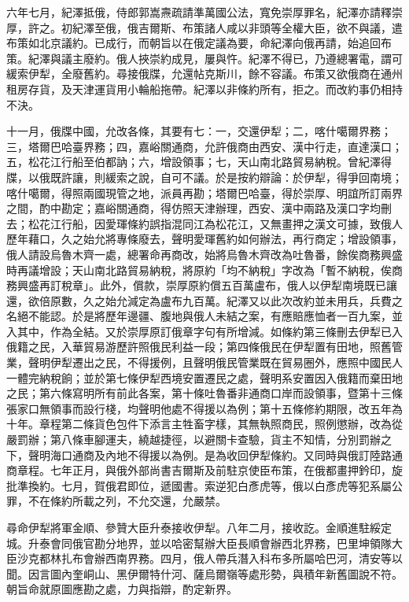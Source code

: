 \begin{pinyinscope}
六年七月，紀澤抵俄，侍郎郭嵩燾疏請準萬國公法，寬免崇厚罪名，紀澤亦請釋崇厚，許之。初紀澤至俄，俄吉爾斯、布策諸人咸以非頭等全權大臣，欲不與議，遣布策如北京議約。已成行，而朝旨以在俄定議為要，命紀澤向俄再請，始追回布策。紀澤與議主廢約。俄人挾崇約成見，屢與忤。紀澤不得已，乃遵總署電，謂可緩索伊犁，全廢舊約。尋接俄牒，允還帖克斯川，餘不容議。布策又欲俄商在通州租房存貨，及天津運貨用小輪船拖帶。紀澤以非條約所有，拒之。而改約事仍相持不決。

十一月，俄牒中國，允改各條，其要有七：一，交還伊犁；二，喀什噶爾界務；三，塔爾巴哈臺界務；四，嘉峪關通商，允許俄商由西安、漢中行走，直達漢口；五，松花江行船至伯都訥；六，增設領事；七，天山南北路貿易納稅。曾紀澤得牒，以俄既許讓，則緩索之說，自可不議。於是按約辯論：於伊犁，得爭回南境；喀什噶爾，得照兩國現管之地，派員再勘；塔爾巴哈臺，得於崇厚、明誼所訂兩界之間，酌中勘定；嘉峪關通商，得仿照天津辦理，西安、漢中兩路及漢口字均刪去；松花江行船，因愛琿條約誤指混同江為松花江，又無畫押之漢文可據，致俄人歷年藉口，久之始允將專條廢去，聲明愛琿舊約如何辦法，再行商定；增設領事，俄人請設烏魯木齊一處，總署命再商改，始將烏魯木齊改為吐魯番，餘俟商務興盛時再議增設；天山南北路貿易納稅，將原約「均不納稅」字改為「暫不納稅，俟商務興盛再訂稅章」。此外，償款，崇厚原約償五百萬盧布，俄人以伊犁南境既已讓還，欲倍原數，久之始允減定為盧布九百萬。紀澤又以此次改約並未用兵，兵費之名絕不能認。於是將歷年邊疆、腹地與俄人未結之案，有應賠應恤者一百九案，並入其中，作為全結。又於崇厚原訂俄章字句有所增減。如條約第三條刪去伊犁已入俄籍之民，入華貿易游歷許照俄民利益一段；第四條俄民在伊犁置有田地，照舊管業，聲明伊犁遷出之民，不得援例，且聲明俄民管業既在貿易圈外，應照中國民人一體完納稅餉；並於第七條伊犁西境安置遷民之處，聲明系安置因入俄籍而棄田地之民；第六條寫明所有前此各案，第十條吐魯番非通商口岸而設領事，暨第十三條張家口無領事而設行棧，均聲明他處不得援以為例；第十五條修約期限，改五年為十年。章程第二條貨色包件下添言主牲畜字樣，其無執照商民，照例懲辦，改為從嚴罰辦；第八條車腳運夫，繞越捷徑，以避關卡查驗，貨主不知情，分別罰辦之下，聲明海口通商及內地不得援以為例。是為收回伊犁條約。又同時與俄訂陸路通商章程。七年正月，與俄外部尚書吉爾斯及前駐京使臣布策，在俄都畫押鈐印，旋批準換約。七月，賀俄君即位，遞國書。索逆犯白彥虎等，俄以白彥虎等犯系屬公罪，不在條約所載之列，不允交還，允嚴禁。

尋命伊犁將軍金順、參贊大臣升泰接收伊犁。八年二月，接收訖。金順進駐綏定城。升泰會同俄官勘分地界，並以哈密幫辦大臣長順會辦西北界務，巴里坤領隊大臣沙克都林扎布會辦西南界務。四月，俄人帶兵潛入科布多所屬哈巴河，清安等以聞。因言圖內奎峒山、黑伊爾特什河、薩烏爾嶺等處形勢，與積年新舊圖說不符。朝旨命就原圖應勘之處，力與指辯，酌定新界。


\end{pinyinscope}
